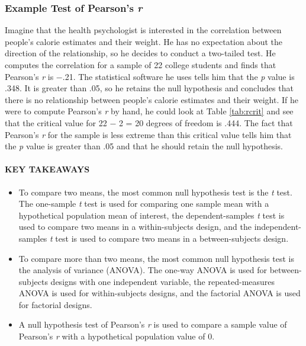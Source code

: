 \documentclass[
]{krantz}
\providecommand{\tightlist}{%
  \setlength{\itemsep}{0pt}\setlength{\parskip}{0pt}}
\begin{document}
\subsubsection*{\texorpdfstring{Example Test of Pearson's \emph{r}}{Example Test of Pearson's r}}\label{example-test-of-pearsons-r}


Imagine that the health psychologist is interested in the correlation between people's calorie estimates and their weight. He has no expectation about the direction of the relationship, so he decides to conduct a two-tailed test. He computes the correlation for a sample of 22 college students and finds that Pearson's \emph{r} is −.21. The statistical software he uses tells him that the \emph{p} value is .348. It is greater than .05, so he retains the null hypothesis and concludes that there is no relationship between people's calorie estimates and their weight. If he were to compute Pearson's \emph{r} by hand, he could look at Table \ref{tab:rcrit} and see that the critical value for 22 − 2 = 20 degrees of freedom is .444. The fact that Pearson's \emph{r} for the sample is less extreme than this critical value tells him that the \emph{p} value is greater than .05 and that he should retain the null hypothesis.

\paragraph*{KEY TAKEAWAYS}\label{key-takeaways-37}

\begin{itemize}
\tightlist
\item
  To compare two means, the most common null hypothesis test is the \emph{t} test. The one-sample \emph{t} test is used for comparing one sample mean with a hypothetical population mean of interest, the dependent-samples \emph{t} test is used to compare two means in a within-subjects design, and the independent-samples \emph{t} test is used to compare two means in a between-subjects design.
\item
  To compare more than two means, the most common null hypothesis test is the analysis of variance (ANOVA). The one-way ANOVA is used for between-subjects designs with one independent variable, the repeated-measures ANOVA is used for within-subjects designs, and the factorial ANOVA is used for factorial designs.
\item
  A null hypothesis test of Pearson's \emph{r} is used to compare a sample value of Pearson's \emph{r} with a hypothetical population value of 0.
\end{itemize}
\end{document}
